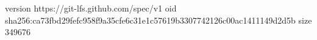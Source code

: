 version https://git-lfs.github.com/spec/v1
oid sha256:ca73fbd29fefc958f9a35cfe6c31e1c57619b3307742126c00ac1411149d2d5b
size 349676
